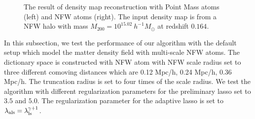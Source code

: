 \documentclass[twocolumn]{aastex62}
\begin{document}
\begin{figure}[!t]
\centering
{}
\caption{The result of density map reconstruction with  Point Mass atoms (left) and  NFW atoms (right). The input density 
        map is from a NFW halo with mass $M_{200}=10^{15.02} ~h^{-1}M_{\odot}$ at redshift $0.164$. 
        } \label{fig-lassoVsadaLasso}
\end{figure}


In this subsection, we test the performance of our algorithm with the default setup which model the matter density
field with multi-scale NFW atoms. The dictionary space is constructed with NFW atom with NFW scale radius set to
three different comoving distances which are 0.12 Mpc/h, 0.24 Mpc/h, 0.36 Mpc/h. The truncation radius is set to
four times of the scale radius.
We test the algorithm with different regularization parameters for the preliminary lasso set to $3.5$ and $5.0$. The 
regularization parameter for the adaptive lasso is set to $\lambda_{\rm{als}}=\lambda_{\rm{ls}}^{\gamma+1}$.
\end{document}
